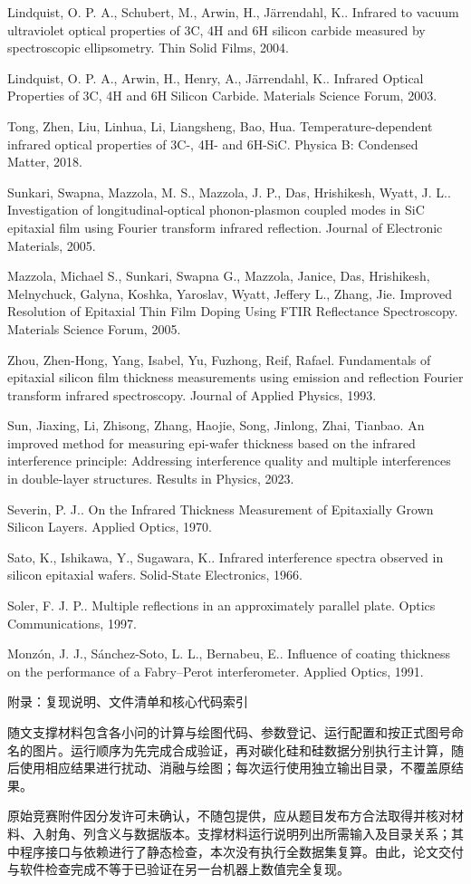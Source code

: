 Lindquist, O. P. A., Schubert, M., Arwin, H., Järrendahl, K.. Infrared
to vacuum ultraviolet optical properties of 3C, 4H and 6H silicon
carbide measured by spectroscopic ellipsometry. Thin Solid Films, 2004.

Lindquist, O. P. A., Arwin, H., Henry, A., Järrendahl, K.. Infrared
Optical Properties of 3C, 4H and 6H Silicon Carbide. Materials Science
Forum, 2003.

Tong, Zhen, Liu, Linhua, Li, Liangsheng, Bao, Hua. Temperature-dependent
infrared optical properties of 3C-, 4H- and 6H-SiC. Physica B: Condensed
Matter, 2018.

Sunkari, Swapna, Mazzola, M. S., Mazzola, J. P., Das, Hrishikesh, Wyatt,
J. L.. Investigation of longitudinal-optical phonon-plasmon coupled
modes in SiC epitaxial film using Fourier transform infrared reflection.
Journal of Electronic Materials, 2005.

Mazzola, Michael S., Sunkari, Swapna G., Mazzola, Janice, Das,
Hrishikesh, Melnychuck, Galyna, Koshka, Yaroslav, Wyatt, Jeffery L.,
Zhang, Jie. Improved Resolution of Epitaxial Thin Film Doping Using FTIR
Reflectance Spectroscopy. Materials Science Forum, 2005.

Zhou, Zhen-Hong, Yang, Isabel, Yu, Fuzhong, Reif, Rafael. Fundamentals
of epitaxial silicon film thickness measurements using emission and
reflection Fourier transform infrared spectroscopy. Journal of Applied
Physics, 1993.

Sun, Jiaxing, Li, Zhisong, Zhang, Haojie, Song, Jinlong, Zhai, Tianbao.
An improved method for measuring epi-wafer thickness based on the
infrared interference principle: Addressing interference quality and
multiple interferences in double-layer structures. Results in Physics,
2023.

Severin, P. J.. On the Infrared Thickness Measurement of Epitaxially
Grown Silicon Layers. Applied Optics, 1970.

Sato, K., Ishikawa, Y., Sugawara, K.. Infrared interference spectra
observed in silicon epitaxial wafers. Solid-State Electronics, 1966.

Soler, F. J. P.. Multiple reflections in an approximately parallel
plate. Optics Communications, 1997.

Monzón, J. J., Sánchez-Soto, L. L., Bernabeu, E.. Influence of coating
thickness on the performance of a Fabry--Perot interferometer. Applied
Optics, 1991.

附录：复现说明、文件清单和核心代码索引

随文支撑材料包含各小问的计算与绘图代码、参数登记、运行配置和按正式图号命名的图片。运行顺序为先完成合成验证，再对碳化硅和硅数据分别执行主计算，随后使用相应结果进行扰动、消融与绘图；每次运行使用独立输出目录，不覆盖原结果。

原始竞赛附件因分发许可未确认，不随包提供，应从题目发布方合法取得并核对材料、入射角、列含义与数据版本。支撑材料运行说明列出所需输入及目录关系；其中程序接口与依赖进行了静态检查，本次没有执行全数据集复算。由此，论文交付与软件检查完成不等于已验证在另一台机器上数值完全复现。
